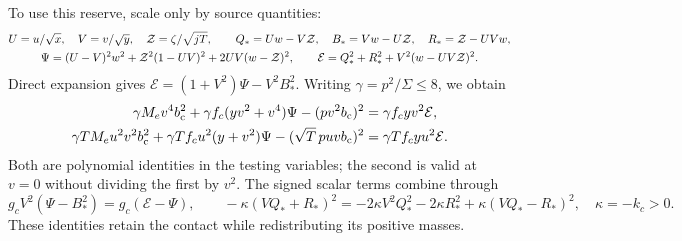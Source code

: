 \documentclass[10pt]{article}
\newcommand{\E}{\mathcal E}
\newcommand{\bc}{b_{\mathrm c}}
\newcommand{\Zc}{\mathcal Z}
\begin{document}
To use this reserve, scale only by source quantities:
\begin{gather}
 U=u/\sqrt x,\quad V=v/\sqrt y,\quad \Zc=\zeta/\sqrt{jT},\qquad
 Q_*=Uw-V\Zc,\quad B_*=Vw-U\Zc,\quad R_*=\Zc-UVw, \notag\\
 \Psi=(U-V)^2w^2+\Zc^2(1-UV)^2+2UV(w-\Zc)^2,\qquad
 \E=Q_*^2+R_*^2+V^2(w-UV\Zc)^2.
 \label{eq:circuit}
\end{gather}
Direct expansion gives $\E=(1+V^2)\Psi-V^2B_*^2$.
Writing $\gamma=p^2/\Sigma\leq8$, we obtain
\begin{align}
 \gamma M_ev^4\bc^2+\gamma f_c(yv^2+v^4)\Psi
       -(pv^2\bc)^2&=\gamma f_cyv^2\E, \notag\\
 \gamma TM_eu^2v^2\bc^2+\gamma Tf_cu^2(y+v^2)\Psi
       -(\sqrt T\,puv\bc)^2&=\gamma Tf_cyu^2\E.
 \label{eq:purchases}
\end{align}
Both are polynomial identities in the testing variables; the second is valid
at $v=0$ without dividing the first by $v^2$.
The signed scalar terms combine through
\begin{equation}
 g_cV^2(\Psi-B_*^2)=g_c(\E-\Psi),\qquad
 -\kappa(VQ_*+R_*)^2
 =-2\kappa V^2Q_*^2-2\kappa R_*^2+\kappa(VQ_*-R_*)^2,
 \quad\kappa=-k_c>0. \label{eq:signed}
\end{equation}
These identities retain the contact while redistributing its positive masses.
\end{document}
